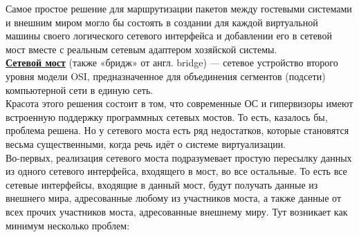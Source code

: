 \documentclass[14pt, a4paper]{article}
\begin{document}
Самое простое решение для маршрутизации пакетов между гостевыми системами и внешним миром
могло бы состоять в создании для каждой виртуальной машины своего логического сетевого
интерфейса и добавлении его в сетевой мост вместе с реальным сетевым адаптером хозяйской
системы.\\

\href{https://ru.wikipedia.org/wiki/Сетевой_мост}{\textbf{Сетевой мост}} (также «бридж» от англ. bridge) — сетевое устройство второго уровня модели OSI,
предназначенное для объединения сегментов (подсети) компьютерной сети в единую сеть.\\

Красота этого решения состоит в том, что современные ОС и гипервизоры имеют встроенную
поддержку программных сетевых мостов. То есть, казалось бы, проблема решена. Но у сетевого
моста есть ряд недостатков, которые становятся весьма существенными, когда речь идёт о системе
виртуализации.\\

Во-первых, реализация сетевого моста подразумевает простую пересылку данных из одного сетевого
интерфейса, входящего в мост, во все остальные. То есть все сетевые интерфейсы, входящие в
данный мост, будут получать данные из внешнего мира, адресованные любому из участников моста, а
также данные от всех прочих участников моста, адресованные внешнему миру. Тут возникает как
минимум несколько проблем:
\end{document}
